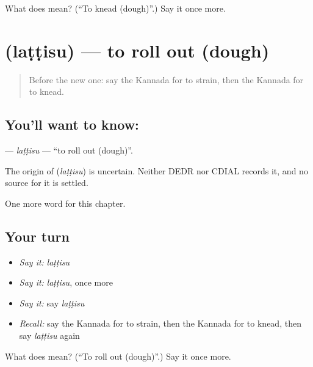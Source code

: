 \begin{tcolorbox}[breakable,colback=teal!4,colframe=teal!35!black,title={Before you move on}]
What does  mean? (\textquotedblleft{}To knead (dough)\textquotedblright{}.) Say it once more.
\end{tcolorbox}
\section[\texorpdfstring{\kn{ಲಟ್ಟಿಸು} (laṭṭisu)}{ಲಟ್ಟಿಸು (laṭṭisu)}]{ (laṭṭisu) — to roll out (dough)}

\label{lesson:KA-C205-lattisu}



\begin{quote}
Before the new one: say the Kannada for to strain, then the Kannada for to knead.
\end{quote}

\subsection*{You'll want to know: }
\textbf{} — \emph{laṭṭisu} — \textquotedblleft{}to roll out (dough)\textquotedblright{}.

\begin{cousinweb}
The origin of \textbf{} (\emph{laṭṭisu}) is uncertain. Neither DEDR nor CDIAL records it, and no source for it is settled.
\end{cousinweb}

\begin{grammarlens}[title={What you've built}]
One more word for this chapter.
\end{grammarlens}

\subsection*{Your turn}
\begin{itemize}
\raggedright
  \item \emph{Say it:} \emph{laṭṭisu}
  \item \emph{Say it:} \emph{laṭṭisu}, once more
  \item \emph{Say it:} say \emph{laṭṭisu}
  \item \emph{Recall:} say the Kannada for to strain, then the Kannada for to knead, then say \emph{laṭṭisu} again
\end{itemize}

\begin{tcolorbox}[breakable,colback=teal!4,colframe=teal!35!black,title={Before you move on}]
What does  mean? (\textquotedblleft{}To roll out (dough)\textquotedblright{}.) Say it once more.
\end{tcolorbox}
